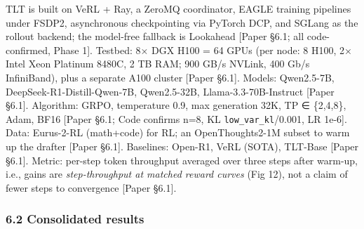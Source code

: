 \documentclass[
  11pt,
  letterpaper,
]{article}
\begin{document}
TLT is built on VeRL + Ray, a ZeroMQ coordinator, EAGLE training
pipelines under FSDP2, asynchronous checkpointing via PyTorch DCP, and
SGLang as the rollout backend; the model-free fallback is Lookahead
{[}Paper §6.1; all code-confirmed, Phase 1{]}. Testbed: 8× DGX H100 = 64
GPUs (per node: 8 H100, 2× Intel Xeon Platinum 8480C, 2 TB RAM; 900 GB/s
NVLink, 400 Gb/s InfiniBand), plus a separate A100 cluster {[}Paper
§6.1{]}. Models: Qwen2.5-7B, DeepSeek-R1-Distill-Qwen-7B, Qwen2.5-32B,
Llama-3.3-70B-Instruct {[}Paper §6.1{]}. Algorithm: GRPO, temperature
0.9, max generation 32K, TP ∈ \{2,4,8\}, Adam, BF16 {[}Paper §6.1; Code
confirms n=8, KL \texttt{low\_var\_kl}/0.001, LR 1e-6{]}. Data:
Eurus-2-RL (math+code) for RL; an OpenThoughts2-1M subset to warm up the
drafter {[}Paper §6.1{]}. Baselines: Open-R1, VeRL (SOTA), TLT-Base
{[}Paper §6.1{]}. Metric: per-step token throughput averaged over three
steps after warm-up, i.e., gains are \emph{step-throughput at matched
reward curves} (Fig 12), not a claim of fewer steps to convergence
{[}Paper §6.1{]}.

\subsubsection{6.2 Consolidated results}\label{consolidated-results}
\end{document}
